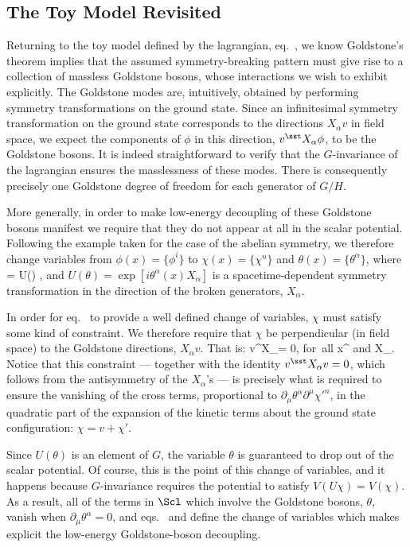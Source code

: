 \documentclass[12pt,epsf]{report}
\begin{document}
\subsection{The Toy Model Revisited}

Returning to the toy model defined by the lagrangian,
eq.~, we know Goldstone's theorem 
implies that the assumed symmetry-breaking pattern
must give rise to a collection of massless Goldstone
bosons, whose interactions we wish to exhibit explicitly.
The Goldstone modes are, intuitively, obtained by
performing symmetry transformations on the ground state.
Since an infinitesimal symmetry transformation on the
ground state corresponds to the directions $X_\alpha v$ in
field space, we expect the components of $\phi$ in this
direction, $v^\sst X_\alpha \phi$, to be the Goldstone
bosons. It is indeed straightforward to verify that the
$G$-invariance of the lagrangian ensures the masslessness
of these modes. There is consequently precisely one
Goldstone degree of freedom for each generator of $G/H$.

More generally, in order to make low-energy decoupling of
these Goldstone bosons manifest we require that they do not
appear at all in the scalar potential. Following the example
taken for the case of the abelian symmetry, we therefore
change variables from 
$\phi(x) = \{ \phi^i\}$ to $\chi(x) = \{ \chi^n \}$ and
$\theta(x) = 
\{ \theta^\alpha \}$, where   
%
\eq
\label{nonabeldef}
\phi = U(\theta) \; \chi ,
\eeq
%
and $U(\theta) = \exp[ i \theta^\alpha(x) X_\alpha]$ is a
spacetime-dependent symmetry transformation in the
direction of the broken generators, $X_\alpha$. 

In order for eq.~ to provide a well
defined change of variables, $\chi$ must satisfy some kind
of constraint. We therefore require that $\chi$ be
perpendicular (in field space) to the Goldstone directions,
$X_\alpha v$. That is:
%
\eq
\label{chicond}
v^\sst X_\alpha \chi = 0, \qquad \hbox{for all} \; x^\mu \;
\hbox{and} \;
X_\alpha.
\eeq
%
Notice that this constraint --- together with the identity
$v^\sst 
X_\alpha v = 0$, which follows from the antisymmetry of the
$X_\alpha$'s --- is precisely what is required to ensure the
vanishing of the cross terms, proportional to $\partial_\mu 
\theta^\alpha \partial^\mu \chi'^n$, in the quadratic part
of the expansion of the kinetic terms about the ground
state configuration: $\chi = v + \chi'$.

Since $U(\theta)$ is an element of $G$, the variable 
$\theta$ is guaranteed to drop out of the scalar potential. 
Of course, this is the point of this change of variables,
and it happens because $G$-invariance requires the 
potential to satisfy $V(U \chi) = V(\chi)$. As a result, all 
of the terms in $\Scl$ which involve the Goldstone bosons, 
$\theta$, vanish when $\partial_\mu \theta^\alpha =0$, 
and eqs.~ and 
 define the change of variables which makes
explicit the low-energy Goldstone-boson decoupling.
\end{document}
